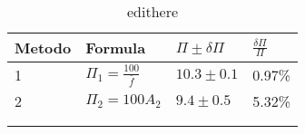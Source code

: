\begin{longtable}{@{}llll@{}}
\toprule
Metodo & Formula & $\Pi \pm \delta \Pi$ & $\frac{\delta \Pi}{\Pi}$ \tabularnewline
\midrule
1 & $\Pi_1 = \frac{100}{\bar{f}}$ & $10.3 \pm 0.1$ & 0.97\% \tabularnewline
2 & $\Pi_2 = 100 A_2$ & $9.4 \pm 0.5$ & 5.32\% \tabularnewline
\bottomrule
\label{tab:edithere}
\\
\caption{edithere}
\end{longtable}
